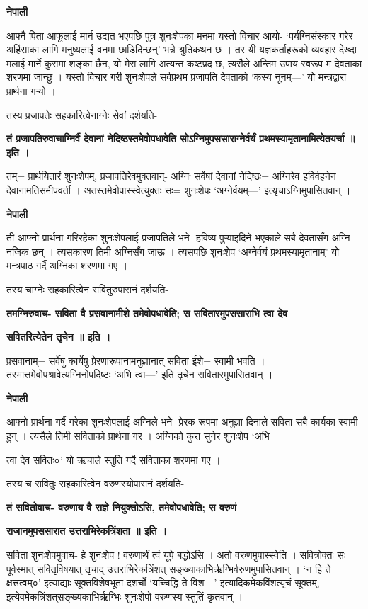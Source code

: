\documentclass[11pt, a5paper]{article}
\begin{document}
\textbf{नेपाली}

आफ्नै पिता आफूलाई मार्न उद्यत भएपछि पुत्र शुनःशेपका मनमा यस्तो विचार आयो- ‘पर्यग्निसंस्कार गरेर अहिंसाका लागि मनुष्यलाई वनमा छाडिदिन्छन्’ भन्ने श्रुतिकथन छ । तर यी यज्ञकर्ताहरूको व्यवहार देख्दा मलाई मार्ने कुरामा शङ्का छैन, यो मेरा लागि अत्यन्त कष्टप्रद छ, त्यसैले अन्तिम उपाय स्वरूप म देवताका शरणमा जान्छु । यस्तो विचार गरी शुनःशेपले सर्वप्रथम प्रजापति देवताको ‘कस्य नूनम्—’ यो मन्त्रद्वारा प्रार्थना गर्‍यो ।

तस्य प्रजापतेः सहकारित्वेनाग्नेः सेवां दर्शयति-

\textbf{तं प्रजापतिरुवाचाग्निर्वै देवानां नेदिष्ठस्तमेवोपधावेति सोऽग्निमुपससाराग्नेर्वर्यं प्रथमस्यामृतानामित्येतयर्चा ॥ इति ।}

तम्= प्रार्थयितारं शुनःशेपम्, प्रजापतिरेवमुक्तवान्- अग्निः सर्वेषां देवानां नेदिष्ठः= अग्निरेव हविर्वहनेन देवानामतिसमीपवर्ती । अतस्तमेवोपास्स्वेत्युक्तः सः= शुनःशेपः ‘अग्नेर्वयम्—’ इत्यृचाऽग्निमुपासितवान् ।

\textbf{नेपाली}

ती आफ्नो प्रार्थना गरिरहेका शुनःशेपलाई प्रजापतिले भने- हविष्य पुर्‍याइदिने भएकाले सबै देवतासँग अग्नि नजिक छन् । त्यसकारण तिमी अग्निसँग जाऊ । त्यसपछि शुनःशेप ‘अग्नेर्वयं प्रथमस्यामृतानाम्’ यो मन्त्रपाठ गर्दै अग्निका शरणमा गए ।

तस्य चाग्नेः सहकारित्वेन सवितुरुपासनं दर्शयति-

\textbf{तमग्निरुवाच- सविता वै प्रसवानामीशे तमेवोपधावेति; स सवितारमुपससाराभि त्वा देव}

\textbf{सवितरित्येतेन तृचेन ॥ इति ।}

प्रसवानाम्= सर्वेषु कार्येषु प्रेरणारूपानामनुज्ञानात् सविता  ईशे‍= स्वामी भवति । तस्मात्तमेवोपश्रावेत्यग्निनोपदिष्टः ‘अभि त्वा---’ इति तृचेन सवितारमुपासितवान् ।

\textbf{नेपाली}

आफ्नो प्रार्थना गर्दै गरेका शुनःशेपलाई अग्निले भने- प्रेरक रूपमा अनुज्ञा दिनाले सविता सबै कार्यका स्वामी हुन् । त्यसैले तिमी सविताको प्रार्थना गर । अग्निको कुरा सुनेर शुनःशेप ‘अभि

त्वा देव सवितः०’ यो ऋचाले स्तुति गर्दै सविताका शरणमा गए ।

तस्य च सवितुः सहकारित्वेन वरुणस्योपासनं दर्शयति-

\textbf{तं सवितोवाच- वरुणाय वै राज्ञे नियुक्तोऽसि, तमेवोपधावेति; स वरुणं}

\textbf{राजानमुपससारात उत्तराभिरेकत्रिंशता ॥ इति ।}

सविता शुनःशेपमुवाच- हे शुनःशेप ! वरुणार्थं त्वं यूपे बद्धोऽसि । अतो वरुणमुपास्स्वेति । सवित्रोक्तः सः पूर्वस्मात् सवितृविषयात् तृचाद् उत्तराभिरेकत्रिंशत् सङ्‌ख्याकाभिर्ऋग्भिर्वरुणमुपासितवान् । ‘न हि ते क्षत्त्रत्वम्०’ इत्याद्याः सूक्तविशेषभूता दशर्चो ‘यच्चिद्धि ते विश---’ इत्यादिकमेकविंशत्यृचं सूक्तम्, इत्येवमेकत्रिंशत्‌सङ्‍ख्यकाभिर्ऋग्भिः शुनःशेपो वरुणस्य स्तुतिं कृतवान् ।
\end{document}

